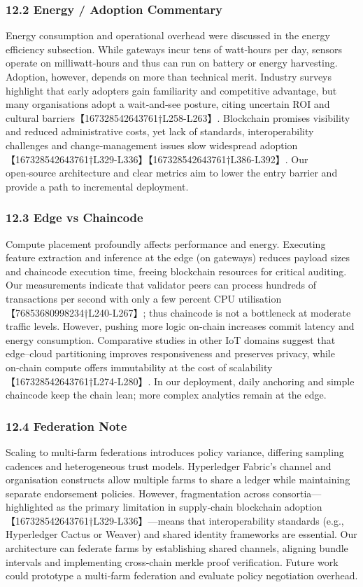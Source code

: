 \subsubsection*{12.2 Energy / Adoption Commentary}
Energy consumption and operational overhead were discussed in the energy efficiency subsection.  While gateways incur tens of watt‑hours per day, sensors operate on milliwatt‑hours and thus can run on battery or energy harvesting.  Adoption, however, depends on more than technical merit.  Industry surveys highlight that early adopters gain familiarity and competitive advantage, but many organisations adopt a wait‑and‑see posture, citing uncertain ROI and cultural barriers【167328542643761†L258-L263】.  Blockchain promises visibility and reduced administrative costs, yet lack of standards, interoperability challenges and change‑management issues slow widespread adoption【167328542643761†L329-L336】【167328542643761†L386-L392】.  Our open‑source architecture and clear metrics aim to lower the entry barrier and provide a path to incremental deployment.

\subsubsection*{12.3 Edge vs Chaincode}
Compute placement profoundly affects performance and energy.  Executing feature extraction and inference at the edge (on gateways) reduces payload sizes and chaincode execution time, freeing blockchain resources for critical auditing.  Our measurements indicate that validator peers can process hundreds of transactions per second with only a few percent CPU utilisation【76853680998234†L240-L267】; thus chaincode is not a bottleneck at moderate traffic levels.  However, pushing more logic on‑chain increases commit latency and energy consumption.  Comparative studies in other IoT domains suggest that edge–cloud partitioning improves responsiveness and preserves privacy, while on‑chain compute offers immutability at the cost of scalability【167328542643761†L274-L280】.  In our deployment, daily anchoring and simple chaincode keep the chain lean; more complex analytics remain at the edge.

\subsubsection*{12.4 Federation Note}
Scaling to multi‑farm federations introduces policy variance, differing sampling cadences and heterogeneous trust models.  Hyperledger Fabric’s channel and organisation constructs allow multiple farms to share a ledger while maintaining separate endorsement policies.  However, fragmentation across consortia—highlighted as the primary limitation in supply‑chain blockchain adoption【167328542643761†L329-L336】—means that interoperability standards (e.g., Hyperledger Cactus or Weaver) and shared identity frameworks are essential.  Our architecture can federate farms by establishing shared channels, aligning bundle intervals and implementing cross‑chain merkle proof verification.  Future work could prototype a multi‑farm federation and evaluate policy negotiation overhead.

